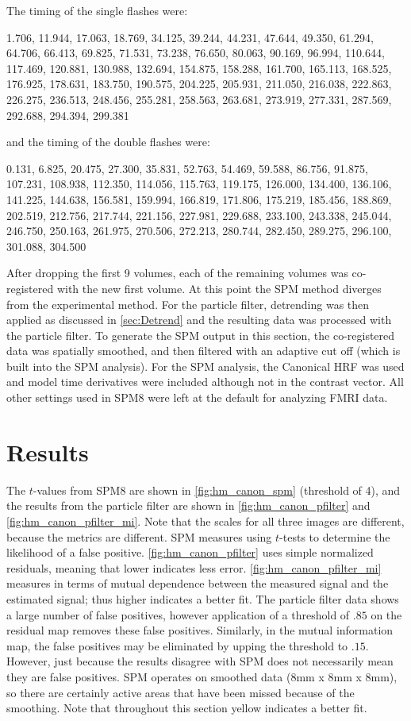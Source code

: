 The timing of the single flashes were:

1.706, 11.944, 17.063, 18.769, 34.125, 39.244, 44.231, 47.644, 49.350,
61.294, 64.706, 66.413, 69.825, 71.531, 73.238, 76.650, 80.063,
90.169, 96.994, 110.644, 117.469, 120.881, 130.988, 132.694, 154.875,
158.288, 161.700, 165.113, 168.525, 176.925, 178.631, 183.750, 190.575,
204.225, 205.931, 211.050, 216.038, 222.863, 226.275, 236.513, 248.456,
255.281, 258.563, 263.681, 273.919, 277.331, 287.569, 292.688, 294.394,
299.381

and the timing of the double flashes were:

0.131, 6.825, 20.475, 27.300, 35.831, 52.763, 54.469, 59.588, 86.756,
91.875, 107.231, 108.938, 112.350, 114.056, 115.763, 119.175, 126.000,
134.400, 136.106, 141.225, 144.638, 156.581, 159.994, 166.819, 171.806,
175.219, 185.456, 188.869, 202.519, 212.756, 217.744, 221.156, 227.981,
229.688, 233.100, 243.338, 245.044, 246.750, 250.163, 261.975, 270.506,
272.213, 280.744, 282.450, 289.275, 296.100, 301.088, 304.500

After dropping the first 9 volumes, each of the remaining volumes was
co-registered with the new first volume. At this point the SPM method
diverges from the experimental method. For the particle filter, detrending
was then applied as discussed in \autoref{sec:Detrend} and the resulting
data was processed with the particle filter. To generate the SPM output
in this section, the co-registered data was spatially smoothed,
and then filtered with an adaptive cut off (which is built into the
SPM analysis). For the SPM analysis, the Canonical HRF was used
and model time derivatives were included although not in the contrast
vector. All other settings used in SPM8 were left at the default
for analyzing FMRI data.

\section{Results}
The $t$-values from SPM8 are shown in \autoref{fig:hm_canon_spm} (threshold of
4), and the results from
the particle filter are shown in \autoref{fig:hm_canon_pfilter} and \autoref{fig:hm_canon_pfilter_mi}.
Note that the scales for all three images are different, because the metrics are different.
SPM measures using $t$-tests to determine the likelihood of a false positive. \autoref{fig:hm_canon_pfilter}
uses simple normalized residuals, meaning that lower indicates less error.
\autoref{fig:hm_canon_pfilter_mi} measures in terms of mutual dependence between the
measured signal and the estimated signal; thus higher indicates a better fit. The particle
filter data shows a large number of false positives, however application of a threshold
of $.85$ on the residual map removes these false positives. Similarly, in the mutual information
map, the false positives may be eliminated by upping the threshold to $.15$. However, just
because the results disagree with SPM does not necessarily mean they are false positives.
SPM operates on smoothed data (8mm x 8mm x 8mm), so there are certainly active
areas that have been missed because of the smoothing. Note that throughout this
section yellow indicates a better fit.

